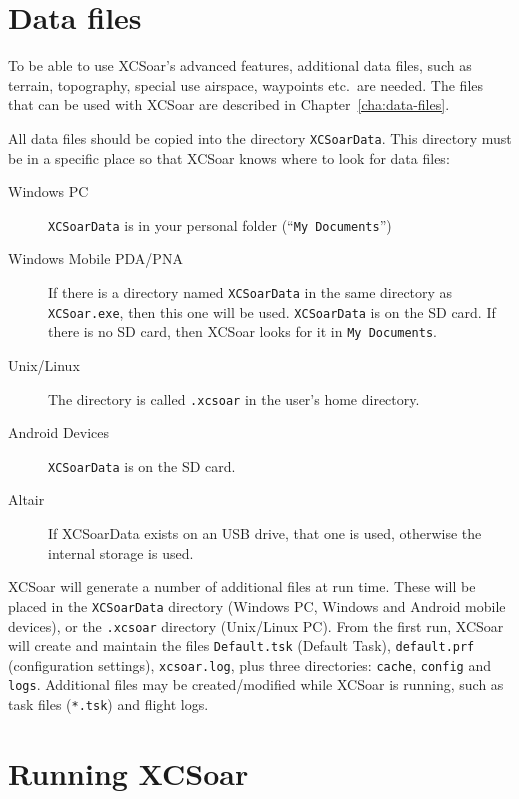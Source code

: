 \section{Data files}\label{sec:data files}

To be able to use XCSoar's advanced features, additional data files, such as
terrain, topography, special use airspace, waypoints etc.\ are needed. The files
that can be used with XCSoar are described in Chapter~\ref{cha:data-files}.

All data files should be copied into the directory
\texttt{XCSoarData}.  This directory must be in a specific place
so that XCSoar knows where to look for data files:

\begin{description}
\item[Windows PC]
\texttt{XCSoarData} is in your personal folder (``\texttt{My
Documents}'')
\item[Windows Mobile PDA/PNA]
If there is a directory named \texttt{XCSoarData} in the same
directory as \texttt{XCSoar.exe}, then this one will be used.
\texttt{XCSoarData} is on the SD card.  If there is no SD card, then
XCSoar looks for it in \texttt{My Documents}.
\item[Unix/Linux]
The directory is called \verb|.xcsoar| in the user's home directory.
\item[Android Devices]
\texttt{XCSoarData} is on the SD card.
\item[Altair]
If XCSoarData exists on an USB drive, that one is used, otherwise the
internal storage is used.
\end{description}


XCSoar will generate a number of additional files at run time.  These
will be placed in the  \texttt{XCSoarData} directory (Windows PC, 
Windows and Android mobile devices), or the \texttt{.xcsoar} directory (Unix/Linux
PC).  From the first run, XCSoar will create and maintain the files 
\texttt{Default.tsk} (Default Task),  
\texttt{default.prf} 
(configuration settings),
\texttt{xcsoar.log}, 
plus three directories: \texttt{cache},
\texttt{config} and \texttt{logs}.  Additional files may be
created/modified while XCSoar is running, such as task files
(\texttt{*.tsk}) and flight logs.


\section{Running XCSoar}

